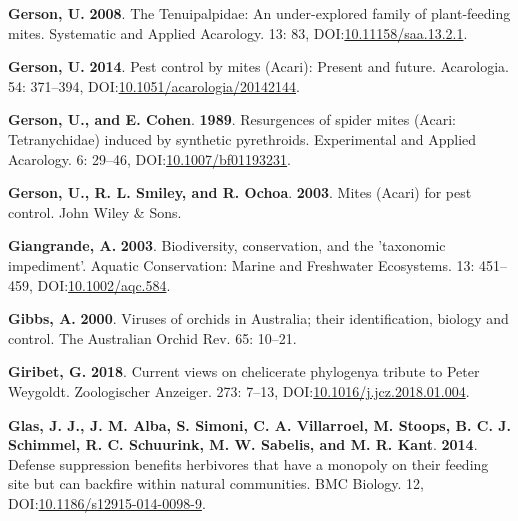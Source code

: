 \documentclass[12pt,final,CPage]{ufthesis}
\newlength{\cslhangindent}
\newenvironment{CSLReferences}[2] %
{%
	\setlength{\parindent}{0pt}
	\ifodd #1 \everypar{\setlength{\hangindent}{\cslhangindent}}\ignorespaces\fi
	\ifnum #2 > 0
	\setlength{\parskip}{#2\baselineskip}
	\fi
}%
{}
\begin{document}
{\begin{CSLReferences}{1}{0}
  \leavevmode{}%
  \textbf{Gerson, U.} \textbf{2008}. The {Tenuipalpidae}: An under-explored family of plant-feeding mites. Systematic and Applied Acarology. 13: 83, DOI:\href{https://doi.org/10.11158/saa.13.2.1}{10.11158/saa.13.2.1}.

  \leavevmode{}%
  \textbf{Gerson, U.} \textbf{2014}. Pest control by mites ({Acari}): Present and future. Acarologia. 54: 371--394, DOI:\href{https://doi.org/10.1051/acarologia/20142144}{10.1051/acarologia/20142144}.

  \leavevmode{}%
  \textbf{Gerson, U., and E. Cohen}. \textbf{1989}. Resurgences of spider mites ({Acari}: {Tetranychidae}) induced by synthetic pyrethroids. Experimental and Applied Acarology. 6: 29--46, DOI:\href{https://doi.org/10.1007/bf01193231}{10.1007/bf01193231}.

  \leavevmode{}%
  \textbf{Gerson, U., R. L. Smiley, and R. Ochoa}. \textbf{2003}. Mites ({Acari}) for pest control. John Wiley \& Sons.

  \leavevmode{}%
  \textbf{Giangrande, A.} \textbf{2003}. Biodiversity, conservation, and the 'taxonomic impediment'. Aquatic Conservation: Marine and Freshwater Ecosystems. 13: 451--459, DOI:\href{https://doi.org/10.1002/aqc.584}{10.1002/aqc.584}.

  \leavevmode{}%
  \textbf{Gibbs, A.} \textbf{2000}. Viruses of orchids in {Australia}; their identification, biology and control. The {Australia}n Orchid Rev. 65: 10--21.

  \leavevmode{}%
  \textbf{Giribet, G.} \textbf{2018}. Current views on chelicerate phylogeny{\textemdash}a tribute to {Peter Weygoldt}. Zoologischer Anzeiger. 273: 7--13, DOI:\href{https://doi.org/10.1016/j.jcz.2018.01.004}{10.1016/j.jcz.2018.01.004}.

  \leavevmode{}%
  \textbf{Glas, J. J., J. M. Alba, S. Simoni, C. A. Villarroel, M. Stoops, B. C. J. Schimmel, R. C. Schuurink, M. W. Sabelis, and M. R. Kant}. \textbf{2014}. Defense suppression benefits herbivores that have a monopoly on their feeding site but can backfire within natural communities. {BMC} Biology. 12, DOI:\href{https://doi.org/10.1186/s12915-014-0098-9}{10.1186/s12915-014-0098-9}.


\end{CSLReferences}}
\end{document}
